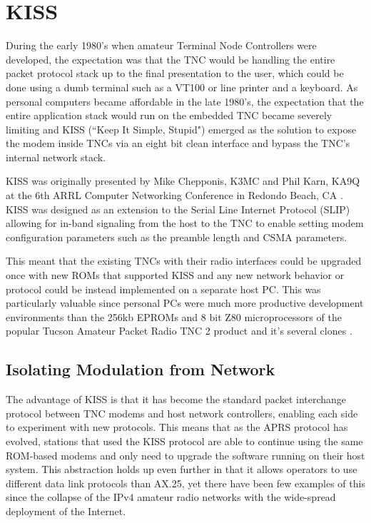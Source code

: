 \chapter{KISS}

During the early 1980's when amateur Terminal Node Controllers were developed,
the expectation was that the TNC would be handling 
the entire packet protocol stack up to the final presentation to the user, which
could be done using a dumb terminal such as a VT100 or line printer 
and a keyboard. 
As personal computers became affordable in the late 1980's, the expectation that
the entire application stack would run on the embedded TNC became severely limiting
and KISS (``Keep It Simple, Stupid") emerged as the solution to 
expose the modem inside TNCs via 
an eight bit clean interface and bypass the TNC's internal network stack.

KISS was originally presented by 
Mike Chepponis, K3MC and Phil Karn, KA9Q at the 6th ARRL Computer Networking
Conference in Redondo Beach, CA \cite{KISSspec}.
KISS was designed as an extension to the Serial Line 
Internet Protocol (SLIP) allowing for in-band signaling from 
the host to the TNC to enable setting modem 
configuration parameters such as the preamble length and CSMA parameters.

This meant that the existing TNCs with their radio interfaces could
be upgraded once with new ROMs that supported KISS and any new network behavior
or protocol could be instead implemented on a separate host PC.
This was particularly valuable since personal PCs were much
more productive development environments than the 256kb EPROMs and 8 bit
Z80 microprocessors of the popular Tucson Amateur Packet Radio TNC 2 product
and it's several clones \cite{TNC2manual}.

\section{Isolating Modulation from Network}

The advantage of KISS is that it has become the standard packet interchange protocol
between TNC modems and host network controllers,
enabling each side to experiment with new protocols.
This means that as the APRS protocol has evolved, stations that used the
KISS protocol are able to continue using the same ROM-based modems and only
need to upgrade the software running on their host system.
This abstraction holds up even further in that it allows operators to
use different data link protocols than AX.25,
yet there have been few examples of this since the collapse of the IPv4 amateur
radio networks with the wide-spread deployment of the Internet.

